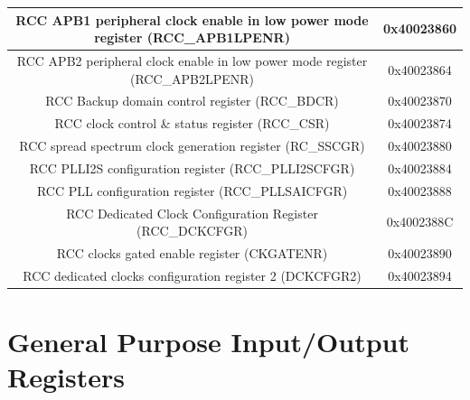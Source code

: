 \documentclass[12pt]{article}
\begin{document}
\begin{tabular}{ |c|c| }
        \hline
        RCC APB1 peripheral clock enable in low power mode register (RCC\_APB1LPENR) & 0x40023860 \\
        \hline
        RCC APB2 peripheral clock enable in low power mode register (RCC\_APB2LPENR) & 0x40023864 \\
        \hline
        RCC Backup domain control register (RCC\_BDCR) & 0x40023870 \\
        \hline
        RCC clock control \& status register (RCC\_CSR) & 0x40023874 \\
        \hline
        RCC spread spectrum clock generation register (RC\_SSCGR) & 0x40023880 \\
        \hline
        RCC PLLI2S configuration register (RCC\_PLLI2SCFGR) & 0x40023884 \\
        \hline
        RCC PLL configuration register (RCC\_PLLSAICFGR) & 0x40023888 \\
        \hline
        RCC Dedicated Clock Configuration Register (RCC\_DCKCFGR) & 0x4002388C \\
        \hline
        RCC clocks gated enable register (CKGATENR) & 0x40023890 \\
        \hline
        RCC dedicated clocks configuration register 2 (DCKCFGR2) & 0x40023894 \\
        \hline
    \end{tabular}
\pagebreak
\section{General Purpose Input/Output Registers}
\end{document}
